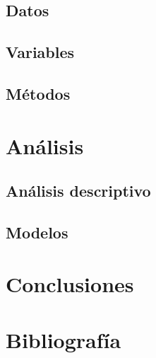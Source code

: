 \documentclass[12pt,twoside]{templates/facsothesis}
\begin{document}
\hypertarget{datos}{%
\section{Datos}\label{datos}}

\hypertarget{variables}{%
\section{Variables}\label{variables}}

\hypertarget{muxe9todos}{%
\section{Métodos}\label{muxe9todos}}

\hypertarget{anuxe1lisis}{%
\chapter{Análisis}\label{anuxe1lisis}}

\hypertarget{anuxe1lisis-descriptivo}{%
\section{Análisis descriptivo}\label{anuxe1lisis-descriptivo}}

\hypertarget{modelos}{%
\section{Modelos}\label{modelos}}

\hypertarget{conclusiones}{%
\chapter{Conclusiones}\label{conclusiones}}

\hypertarget{bibliografuxeda}{%
\chapter*{Bibliografía}\label{bibliografuxeda}}



\end{document}
